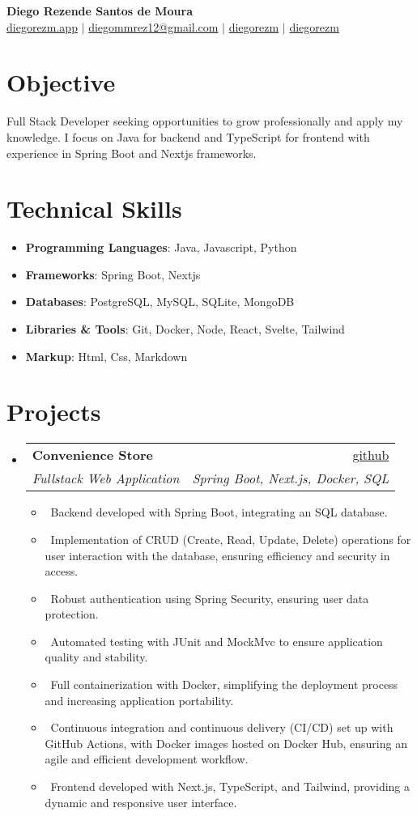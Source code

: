 \documentclass[letterpaper,10pt]{article}
\makeatletter
\newcommand{\resumeItem}[1]{\item\small{#1}}
\newcommand{\resumeSubheading}[4]{
\vspace{-1pt}\item
  \begin{tabular*}{0.97\textwidth}[t]{l@{\extracolsep{\fill}}r}
    \textbf{#1} & #2 \\
    \textit{#3} & \textit{#4} \\
  \end{tabular*}\vspace{-7pt}
}
\newcommand{\resumeSubHeadingList}{\begin{itemize}[leftmargin=0.15in, label={}]}
\newcommand{\resumeSubHeadingListEnd}{\end{itemize}}
\makeatother
\begin{document}
\begin{center}
  \textbf{\Huge Diego Rezende Santos de Moura} \\
  \small
  \faLink \hspace{0.01cm} \href{https://diegorezm.netlify.app/}{diegorezm.app} $|$ 
  \faEnvelope \hspace{0.001cm} \href{mailto:diegommrez12@gmail.com}{diegommrez12@gmail.com} $|$ 
  \faLinkedin \hspace{0.001cm} \href{https://linkedin.com/in/diegorezm}{diegorezm} $|$
  \faGithub \hspace{0.001cm} \href{https://github.com/diegorezm}{diegorezm}
\end{center}

\section*{Objective}
Full Stack Developer seeking opportunities to grow professionally and apply my knowledge. I focus on Java for backend and TypeScript for frontend with experience in Spring Boot and Nextjs frameworks.

\section{Technical Skills}
\resumeSubHeadingList
  \resumeItem{\textbf{Programming Languages}: Java, Javascript, Python}
  \resumeItem{\textbf{Frameworks}: Spring Boot, Nextjs}
    \resumeItem{\textbf{Databases}: PostgreSQL, MySQL, SQLite, MongoDB}
  \resumeItem{\textbf{Libraries \& Tools}: Git, Docker, Node, React, Svelte, Tailwind}
  \resumeItem{\textbf{Markup}: Html, Css, Markdown}
\resumeSubHeadingListEnd

\section{Projects}
\resumeSubHeadingList
  \resumeSubheading
      {Convenience Store}{\href{https://github.com/diegorezm/convenience.store.api}{github}} 
      {Fullstack Web Application}{Spring Boot, Next.js, Docker, SQL}
      \resumeSubHeadingList
          \resumeItem{\textbullet\ Backend developed with Spring Boot, integrating an SQL database.}
          \resumeItem{\textbullet\ Implementation of CRUD (Create, Read, Update, Delete) operations for user interaction with the database, ensuring efficiency and security in access.}
          \resumeItem{\textbullet\ Robust authentication using Spring Security, ensuring user data protection.}
          \resumeItem{\textbullet\ Automated testing with JUnit and MockMvc to ensure application quality and stability.}
          \resumeItem{\textbullet\ Full containerization with Docker, simplifying the deployment process and increasing application portability.}
          \resumeItem{\textbullet\ Continuous integration and continuous delivery (CI/CD) set up with GitHub Actions, with Docker images hosted on Docker Hub, ensuring an agile and efficient development workflow.}
          \resumeItem{\textbullet\ Frontend developed with Next.js, TypeScript, and Tailwind, providing a dynamic and responsive user interface.}
      \resumeSubHeadingListEnd
\resumeSubHeadingListEnd
\end{document}

